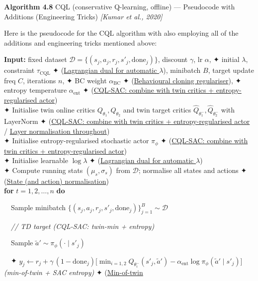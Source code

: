 \documentclass[11pt]{article}
\begin{document}
    \begin{pseudobox}

\textbf{Algorithm 4.8} CQL (conservative Q-learning, offline) ---
Pseudocode with Additions (Engineering Tricks) \emph{{[}Kumar et al.,
2020{]}}

\tcbline

Here is the pseudocode for the CQL algorithm with also employing all of
the additions and engineering tricks mentioned above:

\textbf{Input:} fixed dataset
\(\mathcal{D} = \{(s_j, a_j, r_j, s'_j, \text{done}_j)\}\), discount
\(\gamma\), lr \(\alpha\), ✦ initial \(\lambda\), constraint
\(\tau_\text{CQL}\) ✦ (\hyperref[trick-4-8-1]{Lagrangian dual for
automatic \(\lambda\)}), minibatch \(B\), target update freq \(C\),
iterations \(n\), ✦ BC weight \(\alpha_\text{BC}\) ✦
(\hyperref[trick-4-8-4]{Behavioural cloning regulariser}), ✦ entropy
temperature \(\alpha_\text{ent}\) ✦ (\hyperref[trick-4-8-2]{CQL-SAC:
combine with twin critics + entropy-regularised actor})\\
✦ Initialise twin online critics \(Q_{\theta_1}, Q_{\theta_2}\) and twin
target critics \(\hat{Q}_{\theta_1^-}, \hat{Q}_{\theta_2^-}\) with
LayerNorm ✦ (\hyperref[trick-4-8-2]{CQL-SAC: combine with twin critics +
entropy-regularised actor} / \hyperref[trick-4-8-6]{Layer normalisation
throughout})\\
✦ Initialise entropy-regularised stochastic actor \(\pi_\phi\) ✦
(\hyperref[trick-4-8-2]{CQL-SAC: combine with twin critics +
entropy-regularised actor})\\
✦ Initialise learnable \(\log\lambda\) ✦
(\hyperref[trick-4-8-1]{Lagrangian dual for automatic \(\lambda\)})\\
✦ Compute running stats \((\mu_s,\sigma_s)\) from \(\mathcal{D}\);
normalise all states and actions ✦ (\hyperref[trick-4-8-5]{State (and
action) normalisation})\\
\textbf{for} \(t = 1, 2, \ldots, n\) \textbf{do}\\
\strut ~~Sample minibatch
\(\{(s_j, a_j, r_j, s'_j, \text{done}_j)\}_{j=1}^{B} \sim \mathcal{D}\)\\
\strut ~~\emph{// TD target (CQL-SAC: twin-min + entropy)}\\
\strut ~~Sample \(\tilde{a}' \sim \pi_\phi(\cdot \mid s'_j)\)\\
\strut ~~✦
\(y_j \leftarrow r_j + \gamma\,(1-\text{done}_j)\bigl[\min_{i=1,2}\hat{Q}_{\theta_i^-}(s'_j, \tilde{a}') - \alpha_\text{ent}\log\pi_\phi(\tilde{a}'\mid s'_j)\bigr]\)
\emph{(min-of-twin + SAC entropy)} ✦ (\hyperref[trick-4-8-7]{Min-of-twin
}
\end{pseudobox}
\end{document}

